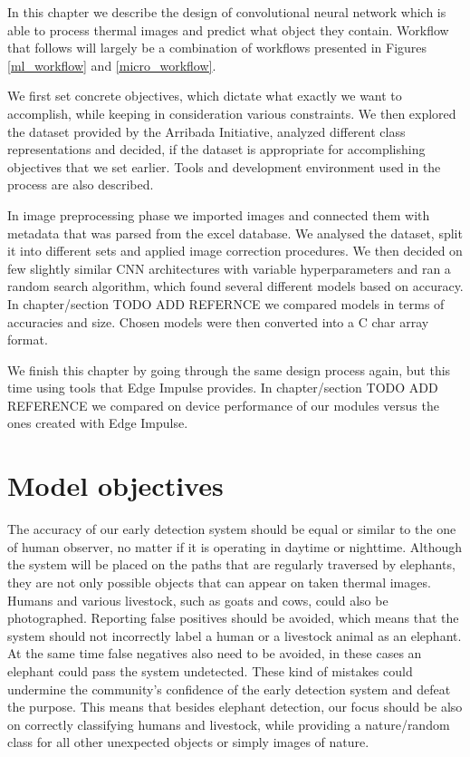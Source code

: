 In this chapter we describe the design of convolutional neural network which is able to process thermal images and predict what object they contain.
Workflow that follows will largely be a combination of workflows presented in Figures \ref{ml_workflow} and \ref{micro_workflow}.

We first set concrete objectives, which dictate what exactly we want to accomplish, while keeping in consideration various constraints.
We then explored the dataset provided by the Arribada Initiative, analyzed different class representations and decided, if the dataset is appropriate for accomplishing objectives that we set earlier.
Tools and development environment used in the process are also described.

In image preprocessing phase we imported images and connected them with metadata that was parsed from the excel database.
We analysed the dataset, split it into different sets and applied image correction procedures.
We then decided on few slightly similar CNN architectures with variable hyperparameters and ran a random search algorithm, which found several different models based on accuracy.
In chapter/section TODO ADD REFERNCE we compared models in terms of accuracies and size.
Chosen models were then converted into a C char array format. 

We finish this chapter by going through the same design process again, but this time using tools that Edge Impulse provides. 
In chapter/section TODO ADD REFERENCE we compared on device performance of our modules versus the ones created with Edge Impulse.


\section{ Model objectives}

The accuracy of our early detection system should be equal or similar to the one of human observer, no matter if it is operating in daytime or nighttime.
Although the system will be placed on the paths that are regularly traversed by elephants, they are not only possible objects that can appear on taken thermal images.
Humans and various livestock, such as goats and cows, could also be photographed.
Reporting false positives should be avoided, which means that the system should not incorrectly label a human or a livestock animal as an elephant.
At the same time false negatives also need to be avoided, in these cases an elephant could pass the system undetected.
These kind of mistakes could undermine the community's confidence of the early detection system and defeat the purpose.
This means that besides elephant detection, our focus should be also on correctly classifying humans and livestock, while providing a nature/random class for all other unexpected objects or simply images of nature.

